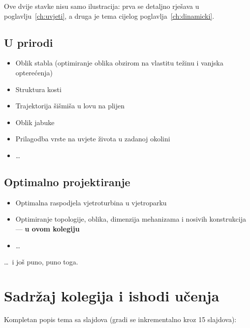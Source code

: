 Ove dvije stavke nisu samo ilustracija: prva se detaljno rješava u
poglavlju~\ref{ch:uvjeti}, a druga je tema cijelog poglavlja~\ref{ch:dinamicki}.

\subsection{U prirodi}
\begin{itemize}
  \item Oblik stabla (optimiranje oblika obzirom na vlastitu težinu i vanjska
        opterećenja)
  \item Struktura kosti
  \item Trajektorija šišmiša u lovu na plijen
  \item Oblik jabuke
  \item Prilagodba vrste na uvjete života u zadanoj okolini
  \item \dots
\end{itemize}

\subsection{Optimalno projektiranje}
\begin{itemize}
  \item Optimalna raspodjela vjetroturbina u vjetroparku
  \item Optimiranje topologije, oblika, dimenzija mehanizama i nosivih
        konstrukcija --- \textbf{u ovom kolegiju}
  \item \dots
\end{itemize}

\dots\ i još puno, puno toga.

\section{Sadržaj kolegija i ishodi učenja}

Kompletan popis tema sa slajdova (gradi se inkrementalno kroz 15 slajdova):


